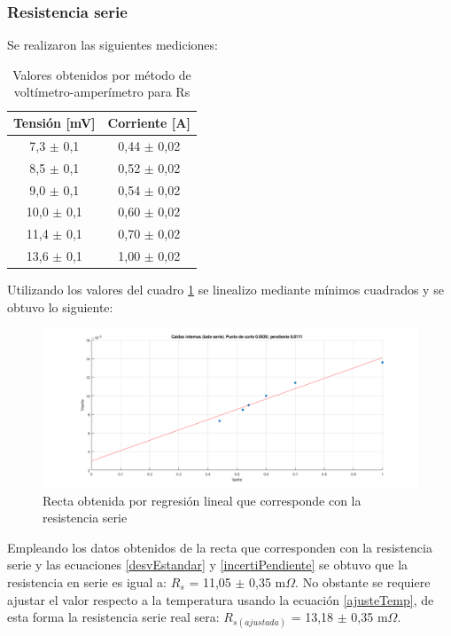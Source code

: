 \documentclass[11pt,letterpaper]{article}     %
\begin{document}
\subsubsection{Resistencia serie}
Se realizaron las siguientes mediciones:
\begin{table}[H]
	\centering
	\caption{Valores obtenidos por método de voltímetro-amperímetro para Rs}
	\label{VoltimetroAmperimetroRs}
	\begin{tabular}{|c|c|}
		\hline
		\textbf{Tensión {[}mV{]}} & \textbf{Corriente {[}A{]}} \\ \hline
		7,3 $\pm$ 0,1            & 0,44 $\pm$ 0,02            \\ \hline
		8,5 $\pm$ 0,1            & 0,52 $\pm$ 0,02            \\ \hline
		9,0 $\pm$ 0,1            & 0,54 $\pm$ 0,02            \\ \hline
		10,0 $\pm$ 0,1            & 0,60 $\pm$ 0,02            \\ \hline
		11,4 $\pm$ 0,1            & 0,70 $\pm$ 0,02             \\ \hline
		13,6 $\pm$ 0,1            & 1,00 $\pm$ 0,02             \\ \hline
	\end{tabular}
\end{table}
Utilizando los valores del cuadro \ref{VoltimetroAmperimetroRs} se linealizo mediante mínimos cuadrados y se obtuvo lo siguiente:
\begin{figure}[H]
	\centering
	\includegraphics[scale=0.5]{./recursos-Lab6/caidasInternasSERIE.png}
	\caption{Recta obtenida por regresión lineal que corresponde con la resistencia serie}
	\label{fig:rectaResistenciaSerie}
\end{figure}
Empleando los datos obtenidos de la recta que corresponden con la resistencia serie y las ecuaciones \ref{desvEstandar} y \ref{incertiPendiente} se obtuvo que la resistencia en serie es igual a: $R_{s}$ = 11,05 $\pm$ 0,35 m$\Omega$.  No obstante se requiere ajustar el valor respecto a la temperatura usando la ecuación \ref{ajusteTemp}, de esta forma la resistencia serie real sera: $R_{s(ajustada)}$ = 13,18 $\pm$ 0,35 m$\Omega$.
\end{document}
